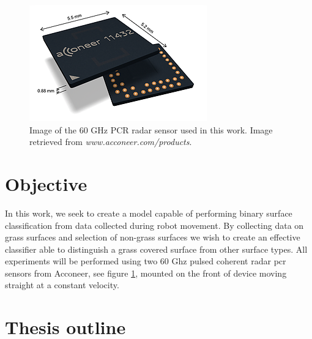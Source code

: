 \begin{figure}
	\centering
	\includegraphics[scale=0.8]{figs_temp/acc_sensor}
	\caption{Image of the 60 GHz PCR radar sensor used in this work. Image retrieved from \emph{www.acconeer.com/products}.}
	\label{fig:acc_sens}
\end{figure}


\section{Objective}

In this work, we seek to create a model capable of performing binary surface classification from data collected during robot movement. By collecting data on grass surfaces and selection of non-grass surfaces we wish to create an effective classifier able to distinguish a grass covered surface from other surface types. All experiments will be performed using two 60 Ghz pulsed coherent radar \gls{pcr} sensors from Acconeer, see figure \ref{fig:acc_sens},  mounted on the front of device moving straight at a constant velocity. 

\section{Thesis outline}

